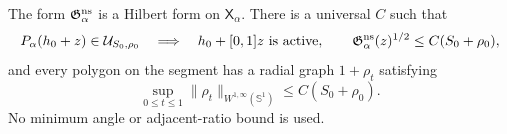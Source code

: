 \begin{proposition}
\label{JP:prop:normal-speed-chart-entry}
The form $\mathfrak G_\alpha^{\rm ns}$ is a Hilbert form on
$\mathsf X_\alpha$.  There is a universal $C$ such that
\begin{equation}\label{JP:eq:normal-speed-chart-entry}
 P_\alpha(h_0+z)\in\mathcal U_{S_0,\rho_0}
 \quad\Longrightarrow\quad
 h_0+[0,1]z\ \hbox{is active},\qquad
 \mathfrak G_\alpha^{\rm ns}(z)^{1/2}\le C(S_0+\rho_0),
\end{equation}
and every polygon on the segment has a radial graph $1+\rho_t$ satisfying
\begin{equation}\label{JP:eq:radial-path-entry}
 \sup_{0\le t\le1}\|\rho_t\|_{W^{1,\infty}(\mathbb S^1)}
 \le C(S_0+\rho_0).
\end{equation}
No minimum angle or adjacent-ratio bound is used.
\end{proposition}

